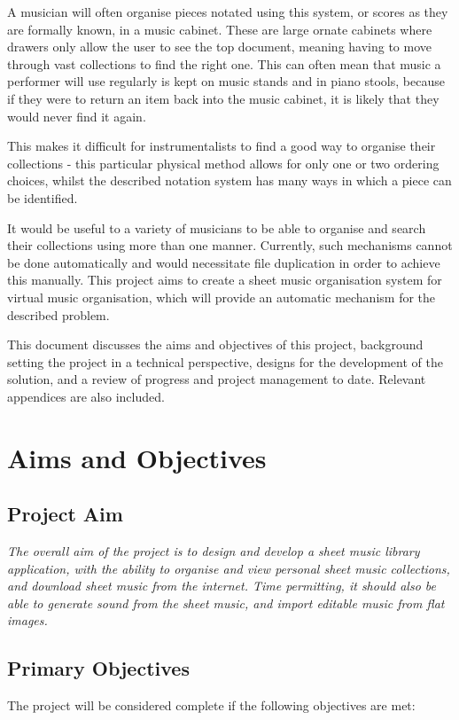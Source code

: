 A musician will often organise pieces notated using this system, or scores as they are formally known, in a music cabinet. These are large ornate cabinets where drawers only allow the user to see the top document, meaning having to move through vast collections to find the right one. This can often mean that music a performer will use regularly is kept on music stands and in piano stools, because if they were to return an item back into the music cabinet, it is likely that they would never find it again.\parencite{SheetMusicRant}

This makes it difficult for instrumentalists to find a good way to organise their collections - this particular physical method allows for only one or two ordering choices, whilst the described notation system has many ways in which a piece can be identified. 

It would be useful to a variety of musicians to be able to organise and search their collections using more than one manner. Currently, such mechanisms cannot be done automatically and would necessitate file duplication in order to achieve this manually. This project aims to create a sheet music organisation system for virtual music organisation, which will provide an automatic mechanism for the described problem.

This document discusses the aims and objectives of this project, background setting the project in a technical perspective, designs for the development of the solution, and a review of progress and project management to date. Relevant appendices are also included.
\pagebreak
\section{Aims and Objectives}
\subsection{Project Aim}
\begin{center}
\textit{The overall aim of the project is to design and develop a sheet music library application, with the ability to organise and view personal sheet music collections, and download sheet music from the internet. Time permitting, it should also be able to generate sound from the sheet music, and import editable music from flat images.}
\end{center}
\subsection{Primary Objectives}
The project will be considered complete if the following objectives are met:
